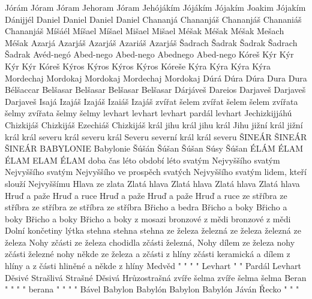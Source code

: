  {Jórám} {Jóram} {Jóram} {Jehoram} {Jóram}
 {Jehójákím} {Jójákím} {Jójakím} {Joakim} {Jójakím}
 {Dánijjél} {Daniel} {Daniel} {Daniel} {Daniel}
 {Chananjá} {Chananjáš} {Chananjáš} {Chananiáš} {Chananjáš}
 {Míšáél} {Míšael} {Míšael} {Mišael} {Mišael}  %
 {Méšak} {Méšak} {Méšak} {Mešach} {Méšak}
 {Azarjá} {Azarjáš} {Azarjáš} {Azariáš} {Azarjáš}
 {Šadrach} {Šadrak} {Šadrak} {Šadrach} {Šadrak}
 {Avéd-negó} {Abed-nego} {Abed-nego} {Abednego} {Abed-nego} 
 {Kóreš} {Kýr} {Kýr} {Kýr} {Kýr}
 {Kóreš} {Kýros} {Kýros} {Kýros} {Kýros}
 {Kóreše} {Kýra} {Kýra} {Kýra} {Kýra}
 {Mordechaj} {Mordokaj} {Mordokaj} {Mordechaj} {Mordokaj}
 {Dúrá} {Dúra} {Dúra} {Dura} {Dura} 
 {Bélšaccar} {Belšasar} {Belšasar} {Belšasar} {Belšasar}
 {Dárjáveš} {Dareios} {Darjaveš} {Darjaveš} {Darjaveš} %
 {Isajá} {Izajáš} {Izajáš} {Izaiáš} {Izajáš}
 {zvířat} {šelem} {zvířat} {šelem} {šelem}
 {zvířata} {šelmy} {zvířata} {šelmy} {šelmy}
 {levhart} {levhart} {levhart} {pardál} {levhart}
 {Jechizkijjáhú} {Chizkijáš} {Chizkijáš} {Ezechiáš} {Chizkijáš}
 {král jihu} {král jihu} {král Jihu} {jižní král} {jižní král}
 {král severu} {král severu} {král Severu} {severní král} {král severu}
 {ŠINEÁR} {ŠINEÁR} {ŠINEÁR} {BABYLONIE} {Babylonie} 
 {Šúšán} {Šúšan} {Šúšan} {Súsy} {Šúšan}
 {ÉLÁM} {ÉLAM} {ÉLAM} {ELAM} {ÉLAM} 
 {doba} {čas} {léto} {období} {léto}   
 {svatým Nejvyššího} {svatým Nejvyššího} {svatým Nejvyššího} {ve prospěch svatých Nejvyššího} {svatým lidem, kteří slouží Nejvyššímu} 
 {Hlava ze zlata} {Zlatá hlava} {Zlatá hlava} {Zlatá hlava} {Zlatá hlava} 
 {Hruď a paže} {Hruď a ruce} {Hruď a paže} {Hruď a paže} {Hruď a ruce} 
 {ze stříbra} {ze stříbra} {ze stříbra} {ze stříbra} {ze stříbra} 
 {Břicho a bedra} {Břicho a boky} {Břicho a boky} {Břicho a boky} {Břicho a boky} 
 {z mosazi} {bronzové} {z mědi} {bronzové} {z mědi} 
 {Dolní končetiny} {lýtka} {stehna} {stehna} {stehna} 
 {ze železa} {železná} {ze železa} {železná} {ze železa} 
 {Nohy zčásti ze železa} {chodidla zčásti železná,} {Nohy dílem ze železa} {nohy zčásti železné} {nohy někde ze železa} 
 {a zčásti z hlíny} {zčásti keramická} {a dílem z hlíny} {a z části hliněné} {a někde z hlíny} 
 {Medvěd} {"} {"} {"} {"} 
 {Levhart} {"} {"} {Pardál} {Levhart} 
 {Děsivé} {Strašlivá} {Strašné} {Děsivá} {Hrůzostrašná} 
 {zvíře} {šelma} {zvíře} {šelma} {šelma} 
 {Beran} {"} {"} {"} {"} 
 {berana} {"} {"} {"} {"} 
 {Bável} {Babylon} {Babylón} {Babylon} {Babylón} 
 {Jáván} {Řecko} {"} {"} {"} 


